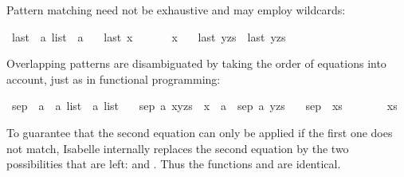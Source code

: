 \begin{isabellebody}
\begin{isamarkuptext}
Pattern matching
need not be exhaustive and may employ wildcards:%
\end{isamarkuptext}%
\isamarkuptrue%
\isamarkupfalse%
\ last\ {\isacharcolon}{\isacharcolon}\ {\isachardoublequoteopen}{\isacharprime}a\ list\ {\isasymRightarrow}\ {\isacharprime}a{\isachardoublequoteclose}\ \isanewline
\ \ {\isachardoublequoteopen}last\ {\isacharbrackleft}x{\isacharbrackright}\ \ \ \ \ \ {\isacharequal}\ x{\isachardoublequoteclose}\ {\isacharbar}\isanewline
\ \ {\isachardoublequoteopen}last\ {\isacharparenleft}{\isacharunderscore}{\isacharhash}y{\isacharhash}zs{\isacharparenright}\ {\isacharequal}\ last\ {\isacharparenleft}y{\isacharhash}zs{\isacharparenright}{\isachardoublequoteclose}%
\begin{isamarkuptext}%
Overlapping patterns are disambiguated by taking the order of equations into
account, just as in functional programming:%
\end{isamarkuptext}%
\isamarkuptrue%
\isamarkupfalse%
\ sep{}\ {\isacharcolon}{\isacharcolon}\ {\isachardoublequoteopen}{\isacharprime}a\ {\isasymRightarrow}\ {\isacharprime}a\ list\ {\isasymRightarrow}\ {\isacharprime}a\ list{\isachardoublequoteclose}\ \isanewline
\ \ {\isachardoublequoteopen}sep{}\ a\ {\isacharparenleft}x{\isacharhash}y{\isacharhash}zs{\isacharparenright}\ {\isacharequal}\ x\ {\isacharhash}\ a\ {\isacharhash}\ sep{}\ a\ {\isacharparenleft}y{\isacharhash}zs{\isacharparenright}{\isachardoublequoteclose}\ {\isacharbar}\isanewline
\ \ {\isachardoublequoteopen}sep{}\ {\isacharunderscore}\ xs\ \ \ \ \ \ \ {\isacharequal}\ xs{\isachardoublequoteclose}%
\begin{isamarkuptext}%
\noindent
To guarantee that the second equation can only be applied if the first
one does not match, Isabelle internally replaces the second equation
by the two possibilities that are left:  and
.  Thus the functions  and
 are identical.


\end{isamarkuptext}
\end{isabellebody}
